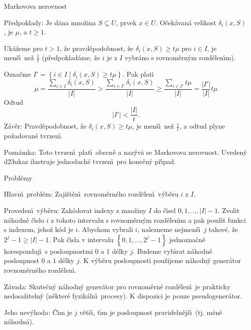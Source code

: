 \subhead
Markovova nerovnost
\endsubhead
\smallskip

\flushpar P\v redpoklady: Je d\'ana mno\v zina $S\subseteq U$, prvek $
x\in U$. 
O\v cek\'a\-va\-n\'a velikost $\delta_i\left(x,S\right)$, je $\mu$, a $t\ge 
1$.
\medskip

\flushpar Uk\'a\v zeme pro $t>1$, \v ze pravd\v epodobnost, \v ze $
\delta_i\left(x,S\right)\ge t\mu$ 
pro $i\in I$, je men\v s\'\i\ ne\v z $\frac 1t$ (p\v redpoklad\'ame, \v ze $
i$ je z $I$ vybr\'ano s 
rovnom\v ern\'ym rozd\v elen\'\i m).  
\medskip

\flushpar Ozna\v cme $I'=\left\{i\in I\mid\delta_i\left(x,S\right)\ge t\mu \right\}$. Pak plat\'\i
$$\mu =\frac {\sum_{i\in I}\delta_i\left(x,S\right)}{|I|}>\frac {\sum_{i\in 
I'}\delta_i\left(x,S\right)}{|I|}\ge\frac {\sum_{i\in I'}t\mu}{|I|}=\frac {|
I'|}{|I|}t\mu$$
\flushpar Odtud
$$|I'|<\frac {|I|}t.$$
\flushpar Z\'av\v er: Pravd\v epodobnost, \v ze $\delta_i\left(x,S\right)\ge 
t\mu$, je men\v s\'\i\ 
ne\v z $\frac 1t$, a odtud plyne po\v zadovan\'e tvrzen\'\i . 
\medskip

\flushpar Pozn\'amka: Toto tvrzen\'\i\ plat\'\i\ obecn\v e a naz\'yv\'a 
se Markovova nerovnost. Uveden\'y d\accent23ukaz 
ilustruje jednoduch\'e tvrzen\'\i\ pro ko\-ne\v c\-n\'y p\v r\'\i pad.
\medskip

\subhead
Probl\'emy
\endsubhead
\smallskip

\flushpar Hlavn\'\i\ probl\'em: Zaji\v st\v en\'\i\ rovnom\v ern\'eho rozd\v elen\'\i\ 
v\'yb\v eru $i$ z $I$.
\medskip

\flushpar Proveden\'\i\ v\'yb\v eru: Zak\'odovat indexy z mno\v ziny $
I$ do 
\v c\'\i sel $0,1,\dots,|I|-1$. Zvolit n\'ahodn\v e \v c\'\i slo $
i$ z tohoto 
intervalu s rovnom\v ern\'ym rozd\v elen\'\i m a pak pou\v z\'\i t 
funkci s indexem, jeho\v z k\'od je $i$. Abychom vybrali $i$, nalezneme 
nejmen\v s\'\i\ $j$ takov\'e, \v ze $2^j-1\ge |I|-1$. Pak \v c\'\i sla v 
intervalu $\left\{0,1,\dots,2^j-1\right\}$ jednozna\v cn\v e koresponduj\'\i\ s 
posloupnostmi $0$ a $1$ d\'elky $j$. Budeme vyb\'\i rat n\'ahodn\v e 
posloupnost $0$ a $1$ d\'elky $j$. K v\'yb\v eru posloupnosti 
pou\v zijeme n\'ahodn\'y gener\'ator rovnom\v ern\'eho rozd\v ele\-n\'\i .
\medskip

\flushpar Z\'avada: Skute\v cn\'y n\'ahodn\'y gener\'ator pro 
rovnom\v ern\'e rozd\v ele\-n\'\i\ je prakticky nedosa\v ziteln\'y 
(n\v ekter\'e fyzik\'aln\'\i\ procesy). K dispozici je pouze 
pseudogener\'ator. 
\medskip

\flushpar Jeho nev\'yhoda: \v C\'\i m je $j$ v\v et\v s\'\i , t\'\i m je 
posloupnost pravideln\v ej\v s\'\i\ (tj. m\'en\v e n\'ahodn\'a). 
\medskip


